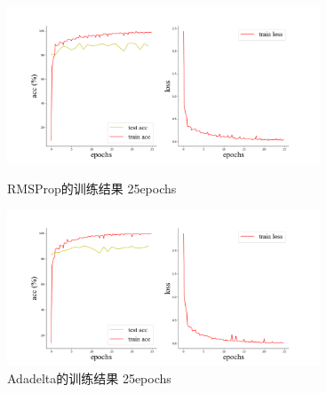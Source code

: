 \documentclass[10.5pt,a4paper]{article}%
\begin{document}
            \begin{figure}[H]
                    \centering
        	\begin{minipage}{0.48\textwidth}
        		\centering
        		\includegraphics[width=0.83\textwidth]{imgs_25e/RMSProp.png}
        		\caption{\fontsize{10pt}{15pt}\selectfont RMSProp的训练结果 25epochs}
        	\end{minipage}
        	\hspace{0cm}%
        	\hfill%
        	\begin{minipage}{0.48\textwidth}
        		\centering
        		\includegraphics[width=0.83\textwidth]{imgs_25e/Adadelta.png}
        		\caption{\fontsize{10pt}{15pt}\selectfont Adadelta的训练结果 25epochs}
        	\end{minipage}
            \end{figure}  
\end{document}
